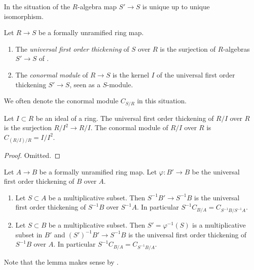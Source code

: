 \noindent
In the situation of
the $R$-algebra map $S' \to S$ is unique up to unique isomorphism.

\begin{definition}
\label{definition-universal-thickening}
Let $R \to S$ be a formally unramified ring map.
\begin{enumerate}
\item The {\it universal first order thickening} of $S$ over $R$ is
the surjection of $R$-algebras $S' \to S$ of
.
\item The {\it conormal module} of $R \to S$ is the kernel $I$ of the
universal first order thickening $S' \to S$, seen as a $S$-module.
\end{enumerate}
We often denote the conormal module {\it $C_{S/R}$} in this situation.
\end{definition}

\begin{lemma}
\label{lemma-universal-thickening-quotient}
Let $I \subset R$ be an ideal of a ring.
The universal first order thickening of $R/I$ over $R$
is the surjection $R/I^2 \to R/I$. The conormal module
of $R/I$ over $R$ is $C_{(R/I)/R} = I/I^2$.
\end{lemma}

\begin{proof}
Omitted.
\end{proof}

\begin{lemma}
\label{lemma-universal-thickening-localize}
Let $A \to B$ be a formally unramified ring map.
Let $\varphi : B' \to B$ be the universal first order thickening of
$B$ over $A$.
\begin{enumerate}
\item Let $S \subset A$ be a multiplicative subset.
Then $S^{-1}B' \to S^{-1}B$ is the universal first order thickening of
$S^{-1}B$ over $S^{-1}A$. In particular $S^{-1}C_{B/A} = C_{S^{-1}B/S^{-1}A}$.
\item Let $S \subset B$ be a multiplicative subset.
Then $S' = \varphi^{-1}(S)$ is a multiplicative subset in $B'$
and $(S')^{-1}B' \to S^{-1}B$ is the universal first order thickening
of $S^{-1}B$ over $A$. In particular $S^{-1}C_{B/A} = C_{S^{-1}B/A}$.
\end{enumerate}
Note that the lemma makes sense by
.
\end{lemma}

